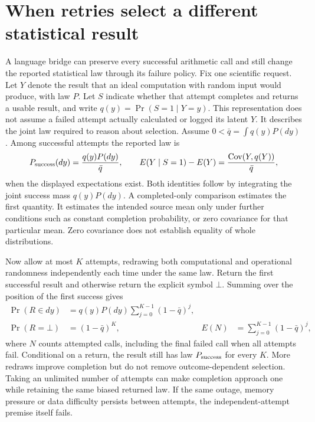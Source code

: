 \section{When retries select a different statistical result}
\label{exec17:s9-retry-selection}

A language bridge can preserve every successful arithmetic call and still
change the reported statistical law through its failure policy. Fix one
scientific request. Let $Y$ denote the result that an ideal computation with
random input would produce, with law $P$. Let $S$ indicate whether that attempt
completes and returns a usable result, and write
$q(y)=\Pr(S=1\mid Y=y)$. This representation does not assume a failed
attempt actually calculated or logged its latent $Y$. It describes the joint
law required to reason about selection. Assume $0<\bar q=\int q(y)P(dy)$.
Among successful attempts the reported law is
\begin{equation}
 P_{\rm success}(dy)=\frac{q(y)P(dy)}{\bar q},\qquad
 E(Y\mid S=1)-E(Y)=\frac{\operatorname{Cov}(Y,q(Y))}{\bar q},
 \label{exec17:s9-success-tilt}
\end{equation}
when the displayed expectations exist. Both identities follow by integrating
the joint success mass $q(y)P(dy)$. A completed-only comparison estimates the
first quantity. It estimates the intended source mean only under further
conditions such as constant completion probability, or zero covariance for
that particular mean. Zero covariance does not establish equality of whole
distributions.

Now allow at most $K$ attempts, redrawing both computational and operational
randomness independently each time under the same law. Return the first
successful result and otherwise return the explicit symbol $\bot$. Summing
over the position of the first success gives
\begin{align}
 \Pr(R\in dy)&=q(y)P(dy)\sum_{j=0}^{K-1}(1-\bar q)^j,
 \nonumber\\
 \Pr(R=\bot)&=(1-\bar q)^K,
 &E(N)&=\sum_{j=0}^{K-1}(1-\bar q)^j,
 \label{exec17:s9-redraw-law}
\end{align}
where $N$ counts attempted calls, including the final failed call when all
attempts fail. Conditional on a return, the result still has law
$P_{\rm success}$ for every $K$. More redraws improve completion but do not
remove outcome-dependent selection. Taking an unlimited number of attempts
can make completion approach one while retaining the same biased returned
law. If the same outage, memory pressure or data difficulty persists between
attempts, the independent-attempt premise itself fails.

